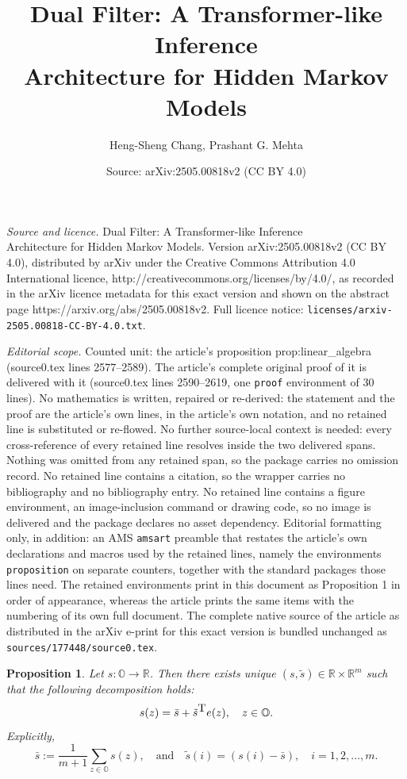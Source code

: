 \documentclass[10pt,a4paper]{amsart}
\title{Dual Filter: A Transformer-like Inference \\ Architecture for Hidden Markov Models}
\author{Heng-Sheng Chang, Prashant G. Mehta}
\date{Source: arXiv:2505.00818v2 (CC BY 4.0)}
\newtheorem{proposition}{Proposition}
\def\Re{\mathbb{R}}
\def\bO{\mathbb{O}}
\def\tp{{\hbox{\rm\tiny T}}}
\begin{document}
\maketitle

\noindent\emph{Source and licence.} Dual Filter: A Transformer-like Inference \\ Architecture for Hidden Markov Models. Version arXiv:2505.00818v2 (CC BY 4.0), distributed by arXiv under the Creative Commons Attribution 4.0 International licence, http://creativecommons.org/licenses/by/4.0/, as recorded in the arXiv licence metadata for this exact version and shown on the abstract page https://arxiv.org/abs/2505.00818v2. Full licence notice: \texttt{licenses/arxiv-2505.00818-CC-BY-4.0.txt}.\par\smallskip

\noindent\textit{Editorial scope.} Counted unit: the article's proposition prop:linear\_algebra (source0.tex lines 2577--2589). The article's complete original proof of it is delivered with it (source0.tex lines 2590--2619, one \texttt{proof} environment of 30 lines). No mathematics is written, repaired or re-derived: the statement and the proof are the article's own lines, in the article's own notation, and no retained line is substituted or re-flowed.  No further source-local context is needed: every cross-reference of every retained line resolves inside the two delivered spans.  Nothing was omitted from any retained span, so the package carries no omission record.  No retained line contains a citation, so the wrapper carries no bibliography and no bibliography entry.  No retained line contains a figure environment, an image-inclusion command or drawing code, so no image is delivered and the package declares no asset dependency.  Editorial formatting only, in addition: an AMS \texttt{amsart} preamble that restates the article's own declarations and macros used by the retained lines, namely the environments \texttt{proposition} on separate counters, together with the standard packages those lines need.  The retained environments print in this document as Proposition 1 in order of appearance, whereas the article prints the same items with the numbering of its own full document.  The complete native source of the article as distributed in the arXiv e-print for this exact version is bundled unchanged as \texttt{sources/177448/source0.tex}.
\begin{proposition}\label{prop:linear_algebra}
  Let $s:\bO\to \Re$. Then there exists unique $(s,\tilde{s}) \in \Re
  \times \Re^m$ such that the following decomposition holds:
  \begin{equation*}
  s(z) = \bar{s} +\tilde{s}^\tp e(z) ,\quad z\in\bO.
\end{equation*}
Explicitly, 
\begin{equation*}
\bar{s}:= \frac{1}{m+1} \sum_{z\in\bO} s(z),\quad \text{and} \quad 
\tilde{s} (i) = (s(i) - \bar{s}),\quad
i=1,2,\hdots,m.
\end{equation*}
\end{proposition}
\end{document}
